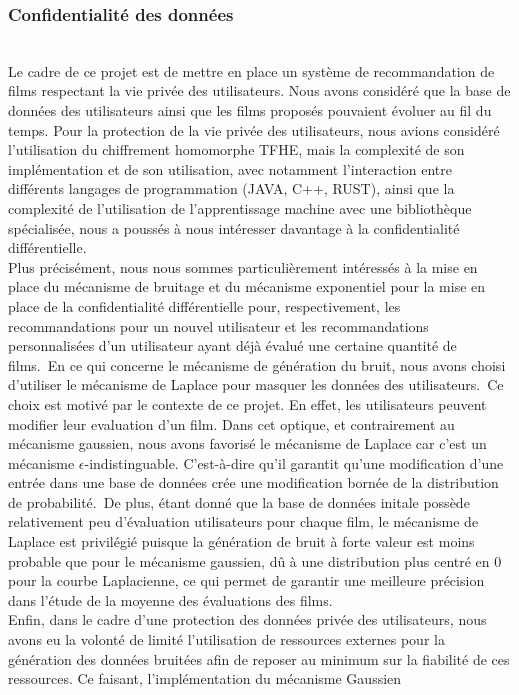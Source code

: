 \documentclass{article}
\begin{document}
\subsubsection{Confidentialité des données}
$ $\\
Le cadre de ce projet est de mettre en place un système de recommandation de films respectant la vie privée des utilisateurs. Nous avons
considéré que la base de données des utilisateurs ainsi que les films proposés pouvaient évoluer au fil du temps.
Pour la protection de la vie privée des utilisateurs, nous avions considéré l'utilisation du chiffrement homomorphe TFHE, mais
la complexité de son implémentation et de son utilisation, avec notamment l'interaction entre différents langages de programmation (JAVA, C++, RUST),
ainsi que la complexité de l'utilisation de l'apprentissage machine avec une bibliothèque spécialisée, nous a poussés à nous intéresser davantage à la confidentialité différentielle.\\
Plus précisément, nous nous sommes particulièrement intéressés à la mise en place du mécanisme de bruitage et du mécanisme exponentiel pour la mise
en place de la confidentialité différentielle pour, respectivement, les recommandations pour un nouvel utilisateur et les recommandations personnalisées
d'un utilisateur ayant déjà évalué une certaine quantité de films.\
En ce qui concerne le mécanisme de génération du bruit, nous avons choisi d'utiliser le mécanisme de Laplace pour masquer les données des utilisateurs.\
Ce choix est motivé par le contexte de ce projet. En effet, les utilisateurs peuvent modifier leur evaluation d'un film. Dans cet optique, et contrairement au 
mécanisme gaussien, nous avons favorisé le mécanisme de Laplace car c'est un mécanisme $\epsilon$-indistinguable. C'est-à-dire qu'il garantit qu'une 
modification d'une entrée dans une base de données crée une modification bornée de la distribution de probabilité.\
De plus, étant donné que la base de données initale possède relativement peu d'évaluation utilisateurs pour chaque film, le mécanisme de Laplace est privilégié
puisque la génération de bruit à forte valeur est moins probable que pour le mécanisme gaussien, dû à une distribution plus centré en 0 pour la courbe Laplacienne, 
ce qui permet de garantir une meilleure précision dans l'étude de la moyenne des évaluations des films.\\
Enfin, dans le cadre d'une protection des données privée des utilisateurs, nous avons eu la volonté de limité l'utilisation de ressources externes 
pour la génération des données bruitées afin de reposer au minimum sur la fiabilité de ces ressources. Ce faisant, l'implémentation du mécanisme Gaussien 
\end{document}
